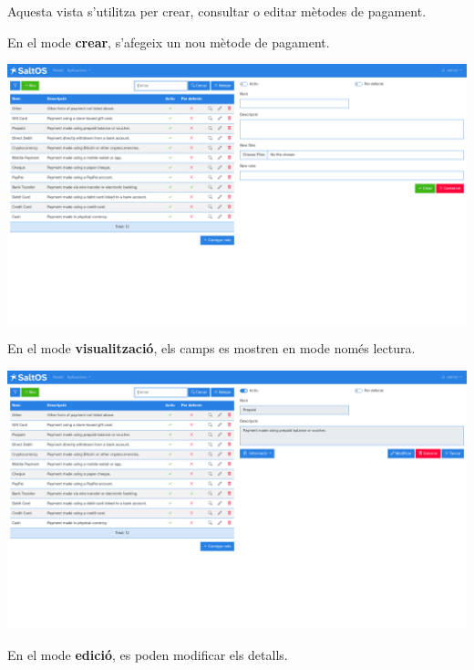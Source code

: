 \documentclass[a4paper]{article}
\begin{document}
Aquesta vista s'utilitza per crear, consultar o editar mètodes de pagament.

En el mode \textbf{crear}, s'afegeix un nou mètode de pagament.

\begin{center}\includegraphics[width=1\textwidth]{../ujest/snaps/test-screenshots-js-screenshots-sales-payment-methods-create-ca-es-1-snap.png}\end{center}

En el mode \textbf{visualització}, els camps es mostren en mode només lectura.

\begin{center}\includegraphics[width=1\textwidth]{../ujest/snaps/test-screenshots-js-screenshots-sales-payment-methods-view-10-ca-es-1-snap.png}\end{center}

En el mode \textbf{edició}, es poden modificar els detalls.
\end{document}
